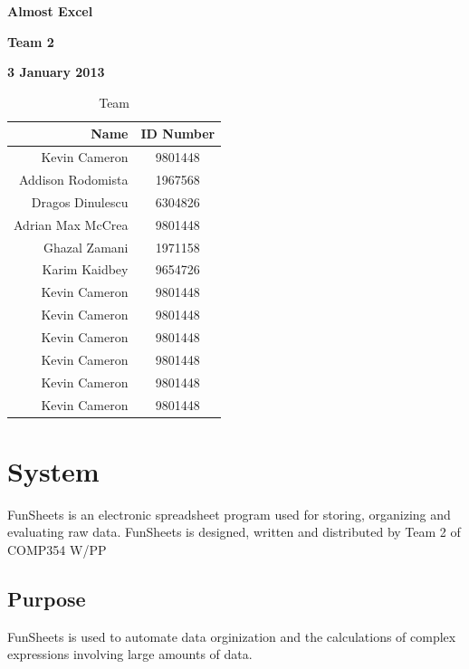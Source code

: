 \documentclass[12pt]{article}
\begin{document}
\vspace*{0.5in}
\centerline{\bf\Large Almost Excel}

\vspace*{0.5in}
\centerline{\bf\Large Team 2}

\vspace*{0.5in}
\centerline{\bf\Large 3 January 2013}

\vspace*{1.5in}
\begin{table}[htbp]
\caption{Team}
\begin{center}
\begin{tabular}{|r | c|}
\hline
Name & ID Number \\\hline\hline
Kevin Cameron & 9801448 \\\hline\hline
Addison Rodomista & 1967568 \\\hline\hline
Dragos Dinulescu & 6304826 \\\hline\hline
Adrian Max McCrea & 9801448 \\\hline\hline
Ghazal Zamani & 1971158 \\\hline\hline
Karim Kaidbey & 9654726 \\\hline\hline
Kevin Cameron & 9801448 \\\hline\hline
Kevin Cameron & 9801448 \\\hline\hline
Kevin Cameron & 9801448 \\\hline\hline
Kevin Cameron & 9801448 \\\hline\hline
Kevin Cameron & 9801448 \\\hline\hline
Kevin Cameron & 9801448 \\\hline
\end{tabular}
\end{center}
\end{table}

\clearpage

\section{System}
FunSheets is an electronic spreadsheet program used for storing, organizing and evaluating raw data. FunSheets is designed, written and distributed by Team 2 of COMP354 W/PP

\subsection{Purpose}
FunSheets is used to automate data orginization and the calculations of complex expressions involving large amounts of data.
\end{document}

